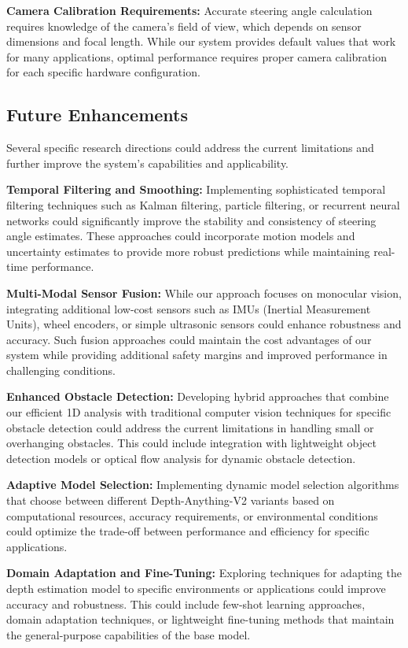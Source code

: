 \documentclass[conference]{IEEEtran}
\begin{document}
\textbf{Camera Calibration Requirements:} Accurate steering angle calculation requires knowledge of the camera's field of view, which depends on sensor dimensions and focal length. While our system provides default values that work for many applications, optimal performance requires proper camera calibration for each specific hardware configuration.

\subsection{Future Enhancements}
Several specific research directions could address the current limitations and further improve the system's capabilities and applicability.

\textbf{Temporal Filtering and Smoothing:} Implementing sophisticated temporal filtering techniques such as Kalman filtering, particle filtering, or recurrent neural networks could significantly improve the stability and consistency of steering angle estimates. These approaches could incorporate motion models and uncertainty estimates to provide more robust predictions while maintaining real-time performance.

\textbf{Multi-Modal Sensor Fusion:} While our approach focuses on monocular vision, integrating additional low-cost sensors such as IMUs (Inertial Measurement Units), wheel encoders, or simple ultrasonic sensors could enhance robustness and accuracy. Such fusion approaches could maintain the cost advantages of our system while providing additional safety margins and improved performance in challenging conditions.

\textbf{Enhanced Obstacle Detection:} Developing hybrid approaches that combine our efficient 1D analysis with traditional computer vision techniques for specific obstacle detection could address the current limitations in handling small or overhanging obstacles. This could include integration with lightweight object detection models or optical flow analysis for dynamic obstacle detection.

\textbf{Adaptive Model Selection:} Implementing dynamic model selection algorithms that choose between different Depth-Anything-V2 variants based on computational resources, accuracy requirements, or environmental conditions could optimize the trade-off between performance and efficiency for specific applications.

\textbf{Domain Adaptation and Fine-Tuning:} Exploring techniques for adapting the depth estimation model to specific environments or applications could improve accuracy and robustness. This could include few-shot learning approaches, domain adaptation techniques, or lightweight fine-tuning methods that maintain the general-purpose capabilities of the base model.
\end{document}
